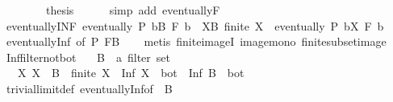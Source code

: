 \begin{isabellebody}
\ \ \isamarkupfalse%
\isanewline
\ \ \isamarkupfalse%
\ \isamarkupfalse%
\ {\isacharquery}{\kern0pt}thesis\isanewline
\ \ \ \ \isamarkupfalse%
\ {\isacharparenleft}{\kern0pt}simp\ add{\isacharcolon}{\kern0pt}\ eventually{\isacharunderscore}{\kern0pt}F{\isacharparenright}{\kern0pt}\isanewline
{}\isamarkupfalse%
%
\endisatagproof
{\isafoldproof}%
%
\isadelimproof
\isanewline
%
\endisadelimproof
\isanewline
{}\isamarkupfalse%
\ eventually{\isacharunderscore}{\kern0pt}INF{\isacharcolon}{\kern0pt}\ {\isachardoublequoteopen}eventually\ P\ {\isacharparenleft}{\kern0pt}{\isasymSqinter}b{\isasymin}B{\isachardot}{\kern0pt}\ F\ b{\isacharparenright}{\kern0pt}\ {\isasymlongleftrightarrow}\ {\isacharparenleft}{\kern0pt}{\isasymexists}X{\isasymsubseteq}B{\isachardot}{\kern0pt}\ finite\ X\ {\isasymand}\ eventually\ P\ {\isacharparenleft}{\kern0pt}{\isasymSqinter}b{\isasymin}X{\isachardot}{\kern0pt}\ F\ b{\isacharparenright}{\kern0pt}{\isacharparenright}{\kern0pt}{\isachardoublequoteclose}\isanewline
%
\isadelimproof
\ \ %
\endisadelimproof
%
\isatagproof
{}\isamarkupfalse%
\ eventually{\isacharunderscore}{\kern0pt}Inf\ {\isacharbrackleft}{\kern0pt}of\ P\ {\isachardoublequoteopen}F{\isacharbackquote}{\kern0pt}B{\isachardoublequoteclose}{\isacharbrackright}{\kern0pt}\isanewline
\ \ \isamarkupfalse%
\ {\isacharparenleft}{\kern0pt}metis\ finite{\isacharunderscore}{\kern0pt}imageI\ image{\isacharunderscore}{\kern0pt}mono\ finite{\isacharunderscore}{\kern0pt}subset{\isacharunderscore}{\kern0pt}image{\isacharparenright}{\kern0pt}%
\endisatagproof
{\isafoldproof}%
%
\isadelimproof
\isanewline
%
\endisadelimproof
\isanewline
{}\isamarkupfalse%
\ Inf{\isacharunderscore}{\kern0pt}filter{\isacharunderscore}{\kern0pt}not{\isacharunderscore}{\kern0pt}bot{\isacharcolon}{\kern0pt}\isanewline
\ \ \ B\ {\isacharcolon}{\kern0pt}{\isacharcolon}{\kern0pt}\ {\isachardoublequoteopen}{\isacharprime}{\kern0pt}a\ filter\ set{\isachardoublequoteclose}\isanewline
\ \ \ {\isachardoublequoteopen}{\isacharparenleft}{\kern0pt}{\isasymAnd}X{\isachardot}{\kern0pt}\ X\ {\isasymsubseteq}\ B\ {\isasymLongrightarrow}\ finite\ X\ {\isasymLongrightarrow}\ Inf\ X\ {\isasymnoteq}\ bot{\isacharparenright}{\kern0pt}\ {\isasymLongrightarrow}\ Inf\ B\ {\isasymnoteq}\ bot{\isachardoublequoteclose}\isanewline
%
\isadelimproof
\ \ %
\endisadelimproof
%
\isatagproof
{}\isamarkupfalse%
\ trivial{\isacharunderscore}{\kern0pt}limit{\isacharunderscore}{\kern0pt}def\ eventually{\isacharunderscore}{\kern0pt}Inf{\isacharbrackleft}{\kern0pt}of\ {\isacharunderscore}{\kern0pt}\ B{\isacharbrackright}{\kern0pt}\isanewline

\end{isabellebody}
